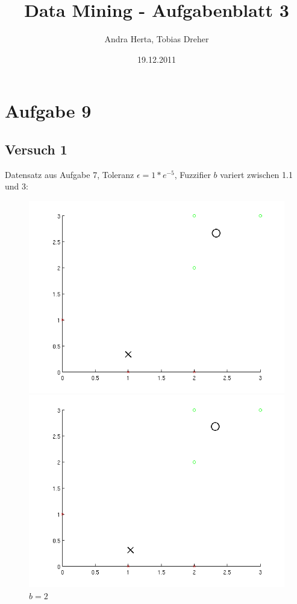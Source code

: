 \title{Data Mining - Aufgabenblatt 3}
\author{Andra Herta, Tobias Dreher}
\date{19.12.2011}

 


\maketitle

\section*{Aufgabe 9}
\subsection*{Versuch 1}
Datensatz aus Aufgabe 7, Toleranz $\epsilon = 1*e^{-5}$, Fuzzifier $b$ variert zwischen 1.1 und 3:
\begin{figure}[h]
  \begin{minipage}[b]{0.5\linewidth}
    \centering
    \includegraphics[width=1\linewidth]{../img/data7b11.png}
    \caption{$b = 1.1$}
  \end{minipage}
  \begin{minipage}[b]{0.5\linewidth}
    \centering
    \includegraphics[width=1\linewidth]{../img/data7b2.png}
    \caption{$b = 2$}	
  \end{minipage}
\end{figure}
